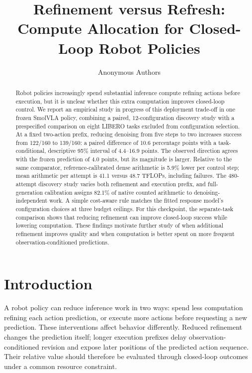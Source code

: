 \documentclass{article}
\title{Refinement versus Refresh:\\
Compute Allocation for Closed-Loop Robot Policies}
\author{Anonymous Authors}
\begin{document}
\maketitle

\begin{abstract}
Robot policies increasingly spend substantial inference compute refining actions
before execution, but it is unclear whether this extra computation improves
closed-loop control. We report an empirical study in progress of this deployment
trade-off in one frozen SmolVLA policy, combining a paired, 12-configuration
discovery study with a prespecified comparison on eight LIBERO tasks excluded
from configuration selection. At a fixed two-action prefix, reducing denoising
from five steps to two increases success from 122/160 to 139/160: a paired
difference of 10.6 percentage points with a task-conditional, descriptive 95\%
interval of 4.4--16.9 points.
The observed direction agrees with the frozen prediction of 4.0 points, but its
magnitude is larger. Relative to the same comparator, reference-calibrated dense
arithmetic is 5.9\% lower per control step; mean arithmetic per attempt is 41.1
versus 48.7 TFLOPs, including failures. The 480-attempt discovery study varies
both refinement and execution prefix, and full-generation calibration assigns
82.1\% of native counted arithmetic to denoising-independent work. A simple
cost-aware rule matches the fitted response model's configuration choices at
three budget ceilings. For this checkpoint, the separate-task comparison shows
that reducing refinement can improve closed-loop success while lowering
computation. These findings motivate further study of when additional refinement
improves quality and when computation is better spent on more frequent
observation-conditioned predictions.
\end{abstract}

\section{Introduction}

A robot policy can reduce inference work in two ways: spend less computation
refining each action prediction, or execute more actions before requesting a
new prediction. These interventions affect behavior differently. Reduced
refinement changes the prediction itself; longer execution prefixes delay
observation-conditioned revision and expose later positions of the predicted
action sequence. Their relative value should therefore be evaluated through
closed-loop outcomes under a common resource constraint.
\end{document}
